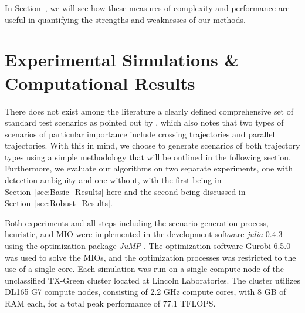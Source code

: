 \documentclass[journal]{IEEEtran}
\begin{document}
In Section~\label{sec:Computational Results}, we will see how these measures of complexity and performance are useful in quantifying the strengths and weaknesses of our methods.

\section{Experimental Simulations \& Computational Results}\label{sec:Results}
There does not exist among the literature a clearly defined comprehensive set of standard test scenarios as pointed out by \cite{MTT-Taxonomy}, which also notes that two types of scenarios of particular importance include crossing trajectories and parallel trajectories. With this in mind, we choose to generate scenarios of both trajectory types using a simple methodology that will be outlined in the following section. Furthermore, we evaluate our algorithms on two separate experiments, one with detection ambiguity and one without, with the first being in Section~\ref{sec:Basic_Results}  here and the second being discussed in Section~\ref{sec:Robust_Results}.

Both experiments and all steps including the scenario generation process, heuristic, and MIO were implemented in the development software \textit{julia} 0.4.3 \cite{julia} using the optimization package \textit{JuMP} \cite{JuMP}. The optimization software Gurobi 6.5.0\cite{gurobi} was used to solve the MIOs, and the optimization processes was restricted to the use of a single core. Each simulation was run on a single compute node of the unclassified TX-Green cluster located at Lincoln Laboratories. The cluster utilizes DL165 G7 compute nodes, consisting of 2.2 GHz compute cores, with 8 GB of RAM each, for a total peak performance of 77.1 TFLOPS\cite{LLGrid}. 
\end{document}
